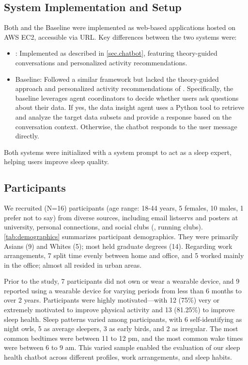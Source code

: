 \subsection{System Implementation and Setup}
Both \name{} and the Baseline were implemented as web-based applications hosted on AWS EC2, accessible via URL. Key differences between the two systems were:
\begin{itemize}
    \item \name{}: Implemented as described in \autoref{sec.chatbot}, featuring theory-guided conversations and personalized activity recommendations.
    \item Baseline: Followed a similar framework but lacked the theory-guided approach and personalized activity recommendations of \name{}. Specifically, the baseline leverages agent coordinators to decide whether users ask questions about their data. If yes, the data insight agent uses a Python tool to retrieve and analyze the target data subsets and provide a response based on the conversation context.  Otherwise, the chatbot responds to the user message directly.
\end{itemize}
Both systems were initialized with a system prompt to act as a sleep expert, helping users improve sleep quality.

\subsection{Participants}\label{subsec.participants}
We recruited (N=16)
participants (age range: 18-44 years, 5 females, 10 males, 1 prefer not to say) from diverse sources, including email listservs and posters at university, personal connections, and social clubs (\eg, running clubs).
\autoref{tab:demographics} summarizes participant demographics.
They were primarily Asians (9) and Whites (5); most held graduate degrees (14).
Regarding work arrangements,
7 split time evenly between home and office, and 5 worked mainly in the office; almost all resided in urban areas.

Prior to the study, 7 participants did not own or wear a wearable device, and 9 reported using a wearable device for varying periods from less than 6 months to over 2 years.
Participants were highly motivated—with 12 (75\%) very or extremely motivated to improve physical activity and 13 (81.25\%) to improve sleep health.
Sleep patterns varied among participants, with 6 self-identifying as night owls, 5 as average sleepers, 3 as early birds, and 2 as irregular.
The most common bedtimes were between 11 to 12 pm, and the most common wake times were between 6 to 9 am.
This varied sample enabled the evaluation of our sleep health chatbot across different profiles, work arrangements, and sleep habits.



